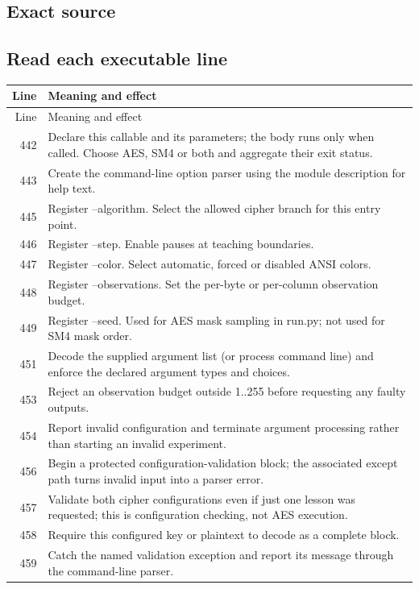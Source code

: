 \subsection*{Exact source}
\subsection*{Read each executable line}
\begingroup\small\begin{longtable}{r >{\raggedright\arraybackslash}p{138mm}}\toprule Line&Meaning and effect\\\midrule\endfirsthead\toprule Line&Meaning and effect\\\midrule\endhead
442&Declare this callable and its parameters; the body runs only when called. Choose AES, SM4 or both and aggregate their exit status.\\
443&Create the command-line option parser using the module description for help text.\\
445&Register --algorithm. Select the allowed cipher branch for this entry point.\\
446&Register --step. Enable pauses at teaching boundaries.\\
447&Register --color. Select automatic, forced or disabled ANSI colors.\\
448&Register --observations. Set the per-byte or per-column observation budget.\\
449&Register --seed. Used for AES mask sampling in run.py; not used for SM4 mask order.\\
451&Decode the supplied argument list (or process command line) and enforce the declared argument types and choices.\\
453&Reject an observation budget outside 1..255 before requesting any faulty outputs.\\
454&Report invalid configuration and terminate argument processing rather than starting an invalid experiment.\\
456&Begin a protected configuration-validation block; the associated except path turns invalid input into a parser error.\\
457&Validate both cipher configurations even if just one lesson was requested; this is configuration checking, not AES execution.\\
458&Require this configured key or plaintext to decode as a complete block.\\
459&Catch the named validation exception and report its message through the command-line parser.\\

\end{longtable}

